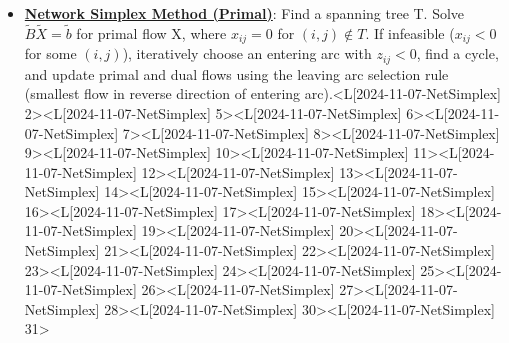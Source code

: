 \documentclass{article}%
\begin{document}
\begin{itemize}[[leftmargin=*]]%
\item \href{https://www.math.purdue.edu/~yipn/421/2024-11-07-NetSimplex.pdf#page=2}{\textbf{Network Simplex Method (Primal)}}: Find a spanning tree T. Solve $\tilde{B}\tilde{X} = \tilde{b}$ for primal flow X, where $x_{ij} = 0$ for $(i,j) \notin T$. If infeasible ($x_{ij} < 0$ for some $(i,j)$), iteratively choose an entering arc with $z_{ij} < 0$, find a cycle, and update primal and dual flows using the leaving arc selection rule (smallest flow in reverse direction of entering arc).<L[2024-11-07-NetSimplex] 2><L[2024-11-07-NetSimplex] 5><L[2024-11-07-NetSimplex] 6><L[2024-11-07-NetSimplex] 7><L[2024-11-07-NetSimplex] 8><L[2024-11-07-NetSimplex] 9><L[2024-11-07-NetSimplex] 10><L[2024-11-07-NetSimplex] 11><L[2024-11-07-NetSimplex] 12><L[2024-11-07-NetSimplex] 13><L[2024-11-07-NetSimplex] 14><L[2024-11-07-NetSimplex] 15><L[2024-11-07-NetSimplex] 16><L[2024-11-07-NetSimplex] 17><L[2024-11-07-NetSimplex] 18><L[2024-11-07-NetSimplex] 19><L[2024-11-07-NetSimplex] 20><L[2024-11-07-NetSimplex] 21><L[2024-11-07-NetSimplex] 22><L[2024-11-07-NetSimplex] 23><L[2024-11-07-NetSimplex] 24><L[2024-11-07-NetSimplex] 25><L[2024-11-07-NetSimplex] 26><L[2024-11-07-NetSimplex] 27><L[2024-11-07-NetSimplex] 28><L[2024-11-07-NetSimplex] 30><L[2024-11-07-NetSimplex] 31>%
\end{itemize}%
\end{document}
